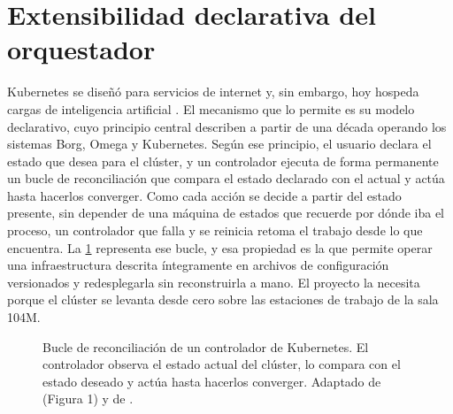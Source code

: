 \section{Extensibilidad declarativa del orquestador}\label{sec:crd-operadores}

Kubernetes se diseñó para servicios de internet y, sin embargo, hoy hospeda cargas de inteligencia artificial \citep{xu-sing-2025}. El mecanismo que lo permite es su modelo declarativo, cuyo principio central describen \citet{burns-borgomegak8s-2016} a partir de una década operando los sistemas Borg, Omega y Kubernetes. Según ese principio, el usuario declara el estado que desea para el clúster, y un controlador ejecuta de forma permanente un bucle de reconciliación que compara el estado declarado con el actual y actúa hasta hacerlos converger. Como cada acción se decide a partir del estado presente, sin depender de una máquina de estados que recuerde por dónde iba el proceso, un controlador que falla y se reinicia retoma el trabajo desde lo que encuentra. La \cref{fig:bucle-reconciliacion} representa ese bucle, y esa propiedad es la que permite operar una infraestructura descrita íntegramente en archivos de configuración versionados y redesplegarla sin reconstruirla a mano. El proyecto la necesita porque el clúster se levanta desde cero sobre las estaciones de trabajo de la sala 104M.

\begin{figure}[H]
  \centering
  \caption[Bucle de reconciliación de un controlador de Kubernetes]{Bucle de reconciliación de un controlador de Kubernetes. El controlador observa el estado actual del clúster, lo compara con el estado deseado y actúa hasta hacerlos converger. Adaptado de \citet{xu-k8soperatorbugs-2024} (Figura 1) y de \citet{burns-borgomegak8s-2016}.}
  \label{fig:bucle-reconciliacion}
\end{figure}

